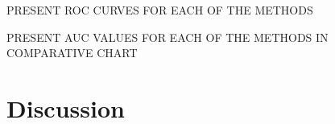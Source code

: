 \documentclass[12pt]{article}
\begin{document}
PRESENT ROC CURVES FOR EACH OF THE METHODS

PRESENT AUC VALUES FOR EACH OF THE METHODS IN COMPARATIVE CHART

\section{Discussion}
\label{sec:disc}







\end{document}
